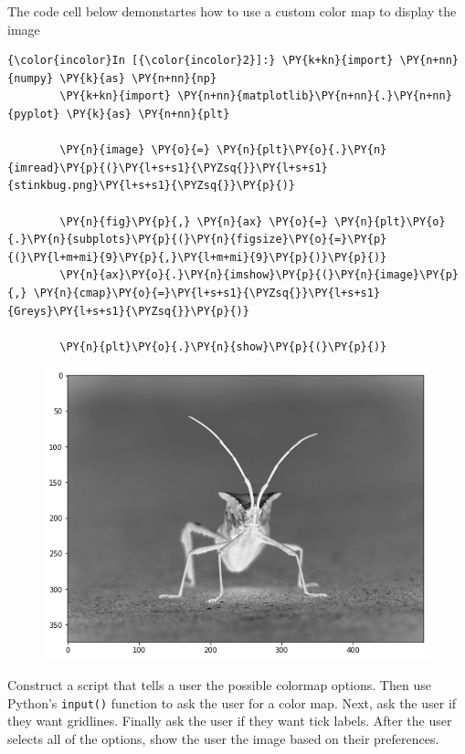 \documentclass[11pt]{article}
\begin{document}
The code cell below demonstartes how to use a custom color map to
display the image

\begin{Verbatim}[commandchars=\\\{\}]
{\color{incolor}In [{\color{incolor}2}]:} \PY{k+kn}{import} \PY{n+nn}{numpy} \PY{k}{as} \PY{n+nn}{np}
        \PY{k+kn}{import} \PY{n+nn}{matplotlib}\PY{n+nn}{.}\PY{n+nn}{pyplot} \PY{k}{as} \PY{n+nn}{plt}
        
        \PY{n}{image} \PY{o}{=} \PY{n}{plt}\PY{o}{.}\PY{n}{imread}\PY{p}{(}\PY{l+s+s1}{\PYZsq{}}\PY{l+s+s1}{stinkbug.png}\PY{l+s+s1}{\PYZsq{}}\PY{p}{)}
        
        \PY{n}{fig}\PY{p}{,} \PY{n}{ax} \PY{o}{=} \PY{n}{plt}\PY{o}{.}\PY{n}{subplots}\PY{p}{(}\PY{n}{figsize}\PY{o}{=}\PY{p}{(}\PY{l+m+mi}{9}\PY{p}{,}\PY{l+m+mi}{9}\PY{p}{)}\PY{p}{)}
        \PY{n}{ax}\PY{o}{.}\PY{n}{imshow}\PY{p}{(}\PY{n}{image}\PY{p}{,} \PY{n}{cmap}\PY{o}{=}\PY{l+s+s1}{\PYZsq{}}\PY{l+s+s1}{Greys}\PY{l+s+s1}{\PYZsq{}}\PY{p}{)}
        
        \PY{n}{plt}\PY{o}{.}\PY{n}{show}\PY{p}{(}\PY{p}{)}
\end{Verbatim}

\begin{figure}[!h]
\begin{center}
\includegraphics[scale=0.35]{combined_files/combined_5_0.png}
\end{center}
\end{figure}
    
Construct a script that tells a user the possible colormap options. Then
use Python's \texttt{input()} function to ask the user for a color map.
Next, ask the user if they want gridlines. Finally ask the user if they
want tick labels. After the user selects all of the options, show the
user the image based on their preferences.
\end{document}
